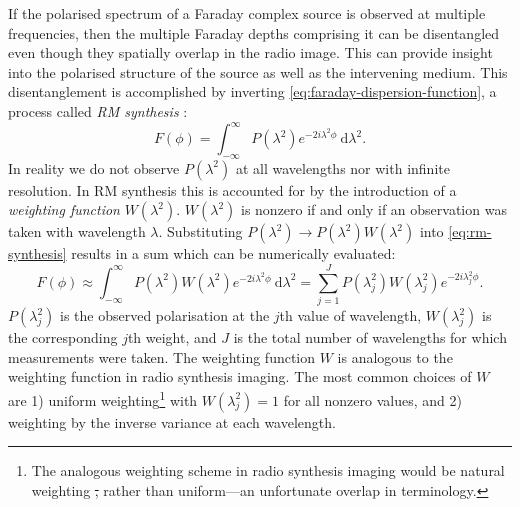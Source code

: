 \documentclass[11pt, a4paper]{book}
\newcommand{\defn}[1]{\emph{#1}}
\providecommand{\DIFdeltex}[1]{{\protect\color{red}\sout{#1}}}                      %
\providecommand{\DIFdelbegin}{} %
\providecommand{\DIFdelend}{} %
\providecommand{\DIFdel}[1]{\texorpdfstring{\DIFdeltex{#1}}{}} %
\newcommand{\DIFscaledelfig}{0.5}
\newlength{\DIFdelgraphicswidth} %
\newlength{\DIFdelgraphicsheight} %
\newcommand{\DIFdelincludegraphics}[2][]{%
\sbox{\DIFdelgraphicsbox}{\DIFOincludegraphics[#1]{#2}}%
\settoboxwidth{\DIFdelgraphicswidth}{\DIFdelgraphicsbox} %
\settoboxtotalheight{\DIFdelgraphicsheight}{\DIFdelgraphicsbox} %
\scalebox{\DIFscaledelfig}{%
\parbox[b]{\DIFdelgraphicswidth}{\usebox{\DIFdelgraphicsbox}\\[-\baselineskip] \rule{\DIFdelgraphicswidth}{0em}}\llap{\resizebox{\DIFdelgraphicswidth}{\DIFdelgraphicsheight}{%
\setlength{\unitlength}{\DIFdelgraphicswidth}%
\begin{picture}(1,1)%
\thicklines\linethickness{2pt} %
{\color[rgb]{1,0,0}\put(0,0){\framebox(1,1){}}}%
{\color[rgb]{1,0,0}\put(0,0){\line( 1,1){1}}}%
{\color[rgb]{1,0,0}\put(0,1){\line(1,-1){1}}}%
\end{picture}%
}\hspace*{3pt}}} %
} %
\DeclareRobustCommand{\DIFdelbegin}{\DIFOdelbegin \let\includegraphics\DIFdelincludegraphics} %
\DeclareRobustCommand{\DIFdelend}{\DIFOaddend \let\includegraphics\DIFOincludegraphics} %
\begin{document}
        If the polarised spectrum of a Faraday complex source is observed at multiple frequencies, then the multiple Faraday depths comprising it can be disentangled even though they spatially overlap in the radio image. This can provide insight into the polarised structure of the source as well as the intervening medium. This disentanglement is accomplished by inverting \autoref{eq:faraday-dispersion-function}, a process called \defn{RM synthesis} \citep{brentjens_faraday_2005}:
        \begin{equation}
            \label{eq:rm-synthesis}
            F(\phi) = \int_{-\infty}^\infty P(\lambda^2) e^{-2i\lambda^2\phi}\ \mathrm{d}\lambda^2.
        \end{equation}
        In reality we do not observe $P(\lambda^2)$ at all wavelengths nor with infinite resolution. In RM synthesis this is accounted for by the introduction of a \defn{weighting function} \citep[or \defn{windowing function}, e.g.][]{heald09faraday} $W(\lambda^2)$. $W(\lambda^2)$ is nonzero if and only if an observation was taken with wavelength $\lambda$. Substituting $P(\lambda^2) \to P(\lambda^2) W(\lambda^2)$ into \autoref{eq:rm-synthesis} results in a sum which can be numerically evaluated:
        \begin{equation}
            \label{eq:weighted-rm-synthesis}
            F(\phi) \approx \int_{-\infty}^\infty P(\lambda^2) W(\lambda^2) e^{-2i\lambda^2\phi}\ \mathrm{d}\lambda^2 = \sum_{j = 1}^J P(\lambda^2_j) W(\lambda^2_j) e^{-2i\lambda^2_j\phi}.
        \end{equation}
        $P(\lambda^2_j)$ is the observed polarisation at the $j$th value of wavelength, $W(\lambda^2_j)$ is the corresponding $j$th weight, and $J$ is the total number of wavelengths for which measurements were taken. The weighting function $W$ is analogous to the weighting function in radio synthesis imaging. The most common choices of $W$ are 1) uniform weighting\footnote{The analogous weighting scheme in radio synthesis imaging would be natural weighting \DIFdelbegin \DIFdel{, }\DIFdelend rather than uniform---an unfortunate overlap in terminology.} with $W(\lambda_j^2) = 1$ for all nonzero values, and 2) weighting by the inverse variance at each wavelength.
\end{document}
